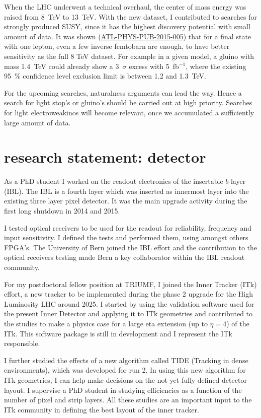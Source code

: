 \documentclass[]{cv} %
\begin{document}
\begin{statement}
When the LHC underwent a technical overhaul, the center of mass energy was
raised from 8~TeV to 13~TeV. With the new dataset, I contributed to searches for
strongly produced SUSY, since it has the highest discovery potential with small
amount of data. It was shown
(\href{https://cds.cern.ch/record/2002608/}{ATL-PHYS-PUB-2015-005}) that for a
final state with one lepton, even a few inverse femtobarn are enough, to have
better sensitivity as the full 8 TeV dataset. For example in a given model, a
gluino with mass 1.4~TeV could already show a 3~$\sigma$ excess with
5~fb$^{-1}$, where the existing 95~\% confidence level exclusion limit is
between 1.2 and 1.3~TeV.

For the upcoming searches, naturalness arguments can lead the way. Hence a
search for light stop's or gluino's should be carried out at high priority.
Searches for light electroweakinos will become relevant, once we accumulated a
sufficiently large amount of data.

\section{research statement: detector}

As a PhD student I worked on the readout electronics of the insertable $b$-layer
(IBL). The IBL is a fourth layer which was inserted as innermost layer into the
existing three layer pixel detector. It was the main upgrade activity during the
first long shutdown in 2014 and 2015.

I tested optical receivers to be used for the readout for reliability, frequency
and input sensitivity. I defined the tests and performed them, using amongst
others FPGA's. The University of Bern joined the IBL effort and the contribution
to the optical receivers testing made Bern a key collaborator within the IBL
readout community.

For my postdoctoral fellow position at TRIUMF, I joined the Inner Tracker (ITk)
effort, a new tracker to be implemented during the phase 2 upgrade for the High
Luminosity LHC around 2025. I started by using the validation software used for
the present Inner Detector and applying it to ITk geometries and contributed to
the studies to make a physics case for a large eta extension (up to $\eta = 4$)
of the ITk. This software package is still in development and I represent the
ITk responsible.

I further studied the effects of a new algorithm called TIDE (Tracking in dense
environments), which was developed for run 2. In using this new algorithm for
ITk geometries, I can help make decisions on the not yet fully defined detector
layout. I supervise a PhD student in studying efficiencies as a function of the
number of pixel and strip layers. All these studies are an important input to
the ITk community in defining the best layout of the inner tracker.

\end{statement}
\end{document}
